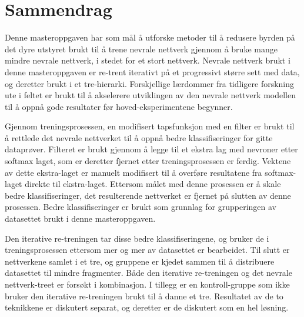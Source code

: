 \chapter*{Sammendrag}

Denne masteroppgaven har som mål å utforske metoder til å redusere byrden på det dyre utstyret brukt til å trene nevrale nettverk gjennom å bruke mange mindre nevrale nettverk, i stedet for et stort nettverk.
Nevrale nettverk brukt i denne masteroppgaven er re-trent iterativt på et progressivt større sett med data, og deretter brukt i et tre-hierarki.
Forskjellige lærdommer fra tidligere forskning ute i feltet er brukt til å akselerere utviklingen av den nevrale nettverk modellen til å oppnå gode resultater før hoved-eksperimentene begynner.

Gjennom treningsprosessen, en modifisert tapsfunksjon med en filter er brukt til å rettlede det nevrale nettverket til å oppnå bedre klassifiseringer for gitte dataprøver.
Filteret er brukt gjennom å legge til et ekstra lag med nevroner etter softmax laget, som er deretter fjernet etter treningsprosessen er ferdig.
Vektene av dette ekstra-laget er manuelt modifisert til å overføre resultatene fra softmax-laget direkte til ekstra-laget.
Ettersom målet med denne prosessen er å skale bedre klassifiseringer, det resulterende nettverket er fjernet på slutten av denne prosessen.
Bedre klassifiseringer er brukt som grunnlag for grupperingen av datasettet brukt i denne masteroppgaven.

Den iterative re-treningen tar disse bedre klassifiseringene, og bruker de i treningsprosessen ettersom mer og mer av datasettet er bearbeidet.
Til slutt er nettverkene samlet i et tre, og gruppene er kjedet sammen til å distribuere datasettet til mindre fragmenter.
Både den iterative re-treningen og det nevrale nettverk-treet er forsøkt i kombinasjon.
I tillegg er en kontroll-gruppe som ikke bruker den iterative re-treningen brukt til å danne et tre.
Resultatet av de to teknikkene er diskutert separat, og deretter er de diskutert som en hel løsning.